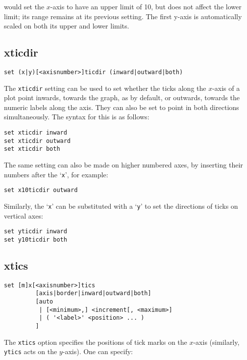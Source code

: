\noindent would set the $x$-axis to have an upper limit of 10, but does not
affect the lower limit; its range remains at its previous setting.  The first
y-axis is automatically scaled on both its upper and lower limits.

\subsection{xticdir}

\begin{verbatim}
set (x|y)[<axisnumber>]ticdir (inward|outward|both)
\end{verbatim}

The {\tt xticdir} setting can be used to set whether the ticks along the
$x$-axis of a plot point inwards, towards the graph, as by default, or outwards,
towards the numeric labels along the axis. They can also be set to point in both
directions simultaneously. The syntax for this is as follows:

\begin{verbatim}
set xticdir inward 
set xticdir outward 
set xticdir both
\end{verbatim}

The same setting can also be made on higher numbered axes, by inserting their
numbers after the `{\tt x}', for example:

\begin{verbatim}
set x10ticdir outward
\end{verbatim}

Similarly, the `{\tt x}' can be substituted with a `{\tt y}' to set the directions of ticks
on vertical axes:

\begin{verbatim}
set yticdir inward
set y10ticdir both
\end{verbatim}

\subsection{xtics}

\begin{verbatim}
set [m]x[<axisnumber>]tics 
         [axis|border|inward|outward|both] 
         [auto 
          | [<minimum>,] <increment[, <maximum>] 
          | ( '<label>' <position> ... ) 
         ] 
\end{verbatim}

The {\tt xtics} option specifies the positions of tick marks on the $x$-axis
(similarly, {\tt ytics} acts on the $y$-axis).  One can specify:

